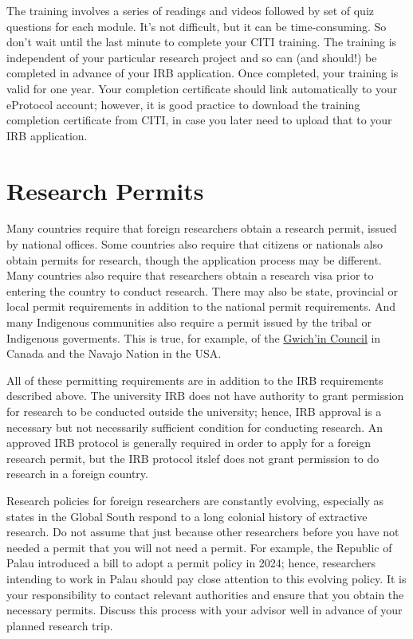 \documentclass[
]{book}
\begin{document}
The training involves a series of readings and videos followed by set of quiz questions for each module. It's not difficult, but it can be time-consuming. So don't wait until the last minute to complete your CITI training. The training is independent of your particular research project and so can (and should!) be completed in advance of your IRB application. Once completed, your training is valid for one year. Your completion certificate should link automatically to your eProtocol account; however, it is good practice to download the training completion certificate from CITI, in case you later need to upload that to your IRB application.

\section{Research Permits}\label{permits}

Many countries require that foreign researchers obtain a research permit, issued by national offices. Some countries also require that citizens or nationals also obtain permits for research, though the application process may be different. Many countries also require that researchers obtain a research visa prior to entering the country to conduct research. There may also be state, provincial or local permit requirements in addition to the national permit requirements. And many Indigenous communities also require a permit issued by the tribal or Indigenous goverments. This is true, for example, of the \href{https://gwichincouncil.com/research}{Gwich'in Council} in Canada and the Navajo Nation in the USA.

All of these permitting requirements are in addition to the IRB requirements described above. The university IRB does not have authority to grant permission for research to be conducted outside the university; hence, IRB approval is a necessary but not necessarily sufficient condition for conducting research. An approved IRB protocol is generally required in order to apply for a foreign research permit, but the IRB protocol itslef does not grant permission to do research in a foreign country.

Research policies for foreign researchers are constantly evolving, especially as states in the Global South respond to a long colonial history of extractive research. Do not assume that just because other researchers before you have not needed a permit that you will not need a permit. For example, the Republic of Palau introduced a bill to adopt a permit policy in 2024; hence, researchers intending to work in Palau should pay close attention to this evolving policy. It is your responsibility to contact relevant authorities and ensure that you obtain the necessary permits. Discuss this process with your advisor well in advance of your planned research trip.
\end{document}
